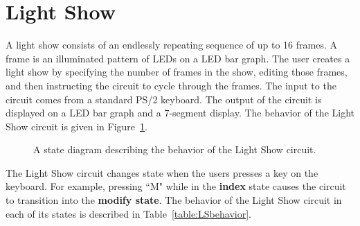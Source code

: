 \documentclass{article}[10 pt,landscape]
\begin{document}
\newcommand{\bs}{\backslash}


\section{Light Show}

A light show consists of an endlessly repeating sequence of up to 16 frames. 
A frame is an illuminated pattern of LEDs on a LED bar graph. The user 
creates a light show by specifying the number of frames in the show, editing 
those frames, and then instructing the circuit to cycle through the frames. 
The input to the circuit comes from a standard PS/2 keyboard. The output of 
the circuit is displayed on a LED bar graph and a 7-segment display. The 
behavior of the Light Show circuit is given in Figure~\ref{fig:LSbehavior}.
 
\begin{figure}[ht]
\caption{A state diagram describing the behavior of the Light Show circuit.}
\label{fig:LSbehavior}
\end{figure}

The Light Show circuit changes state when the users presses a key on 
the keyboard. For example, pressing ``M" while in the {\bf index } state causes 
the circuit to transition into the {\bf modify state}. The behavior of the 
Light Show circuit in each of its states is described in 
Table~\ref{table:LSbehavior}.
\end{document}

